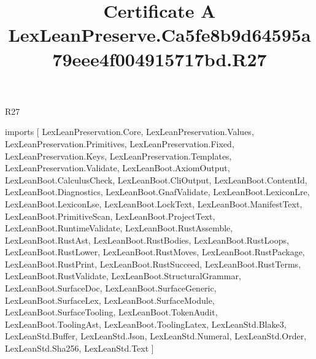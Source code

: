 \begin{lexlean}{R27}
\title{Certificate A LexLeanPreserve.Ca5fe8b9d64595a79eee4f004915717bd.R27}
\begin{coremodule}
imports [
  LexLeanPreservation.Core,
  LexLeanPreservation.Values,
  LexLeanPreservation.Primitives,
  LexLeanPreservation.Fixed,
  LexLeanPreservation.Keys,
  LexLeanPreservation.Templates,
  LexLeanPreservation.Validate,
  LexLeanBoot.AxiomOutput,
  LexLeanBoot.CalculusCheck,
  LexLeanBoot.CliOutput,
  LexLeanBoot.ContentId,
  LexLeanBoot.Diagnostics,
  LexLeanBoot.GnafValidate,
  LexLeanBoot.LexiconLre,
  LexLeanBoot.LexiconLse,
  LexLeanBoot.LockText,
  LexLeanBoot.ManifestText,
  LexLeanBoot.PrimitiveScan,
  LexLeanBoot.ProjectText,
  LexLeanBoot.RuntimeValidate,
  LexLeanBoot.RustAssemble,
  LexLeanBoot.RustAst,
  LexLeanBoot.RustBodies,
  LexLeanBoot.RustLoops,
  LexLeanBoot.RustLower,
  LexLeanBoot.RustMoves,
  LexLeanBoot.RustPackage,
  LexLeanBoot.RustPrint,
  LexLeanBoot.RustSucceed,
  LexLeanBoot.RustTerms,
  LexLeanBoot.RustValidate,
  LexLeanBoot.StructuralGrammar,
  LexLeanBoot.SurfaceDoc,
  LexLeanBoot.SurfaceGeneric,
  LexLeanBoot.SurfaceLex,
  LexLeanBoot.SurfaceModule,
  LexLeanBoot.SurfaceTooling,
  LexLeanBoot.TokenAudit,
  LexLeanBoot.ToolingAst,
  LexLeanBoot.ToolingLatex,
  LexLeanStd.Blake3,
  LexLeanStd.Buffer,
  LexLeanStd.Json,
  LexLeanStd.Numeral,
  LexLeanStd.Order,
  LexLeanStd.Sha256,
  LexLeanStd.Text
]


\end{coremodule}
\end{lexlean}
